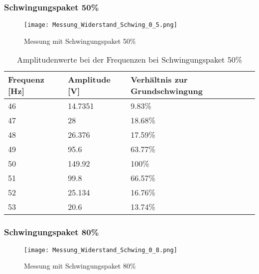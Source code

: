 \subsubsection*{Schwingungspaket 50\%}
\begin{figure}[ht!]
	\centering
	\texttt{[image: Messung\_Widerstand\_Schwing\_0\_5.png]}	
	\caption{Messung mit Schwingungspaket 50\%}\label{fig:Mess_Schwing_50}
\end{figure}

\begin{table}[ht!]
	\centering
	\begin{tabular}{|l|l|l|}
		\hline
		Frequenz {[}Hz{]} & Amplitude {[}V{]} & Verhältnis zur Grundschwingung \\ \hline
		46                & 14.7351           & 9.83\%                         \\ \hline
		47                & 28                & 18.68\%                        \\ \hline
		48                & 26.376            & 17.59\%                        \\ \hline
		49                & 95.6              & 63.77\%                        \\ \hline
		50                & 149.92            & 100\%                          \\ \hline
		51                & 99.8              & 66.57\%                        \\ \hline
		52                & 25.134            & 16.76\%                        \\ \hline
		53                & 20.6              & 13.74\%                        \\ \hline
	\end{tabular}
\caption{Amplitudenwerte bei der Frequenzen bei Schwingungspaket 50\%}\label{tab:Mess_Spannung_Schwing_50}
\end{table}


\newpage
\subsubsection*{Schwingungspaket 80\%}
\begin{figure}[ht!]
	\centering
	\texttt{[image: Messung\_Widerstand\_Schwing\_0\_8.png]}	
	\caption{Messung mit Schwingungspaket 80\%}\label{fig:Mess_Schwing_80}
\end{figure}

